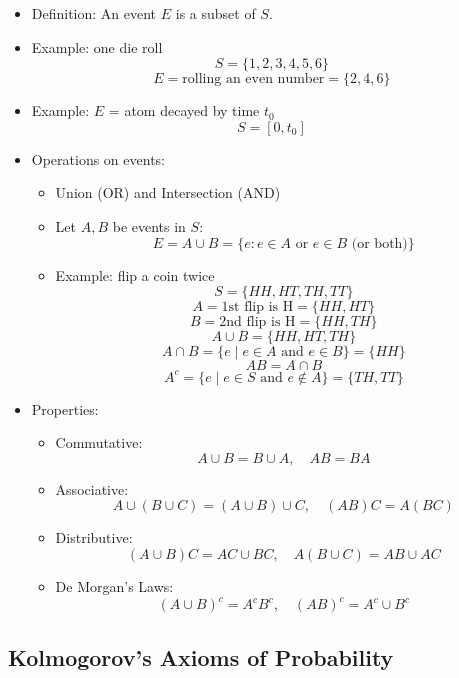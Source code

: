 \begin{itemize}
    \item Definition: An event $E$ is a subset of $S$.
    \item Example: one die roll
          \[ S = \{1, 2, 3, 4, 5, 6\} \]
          \[ E = \text{rolling an even number} = \{2, 4, 6\} \]
    \item Example: $E$ = atom decayed by time $t_0$
          \[ S = [0, t_0] \]

    \item Operations on events:
          \begin{itemize}
              \item Union (OR) and Intersection (AND)
              \item Let $A, B$ be events in $S$:
                    \[ E = A \cup B = \{e: e \in A \text{ or } e \in B \text{ (or both)}\} \]
              \item Example: flip a coin twice
                    \[ S = \{HH, HT, TH, TT\} \]
                    \[ A = \text{1st flip is H} = \{HH, HT\} \]
                    \[ B = \text{2nd flip is H} = \{HH, TH\} \]
                    \[ A \cup B = \{HH, HT, TH\} \]
                    \[ A \cap B = \{ e \mid e \in A \text{ and } e \in B \} = \{HH\} \]
                    \[ AB = A \cap B \]
                    \[ A^c = \{ e \mid e \in S \text{ and } e \notin A \} = \{TH, TT\} \]
          \end{itemize}

    \item Properties:
          \begin{itemize}
              \item Commutative:
                    \[ A \cup B = B \cup A, \quad AB = BA \]
              \item Associative:
                    \[ A \cup (B \cup C) = (A \cup B) \cup C , \quad (AB)C = A(BC) \]
              \item Distributive:
                    \[ (A\cup B)C = AC \cup BC, \quad A(B \cup C) = AB \cup AC \]
              \item De Morgan's Laws:
                    \[ (A \cup B)^c = A^c B^c, \quad (AB)^c = A^c \cup B^c \]
          \end{itemize}
\end{itemize}

\subsection{Kolmogorov's Axioms of Probability}

